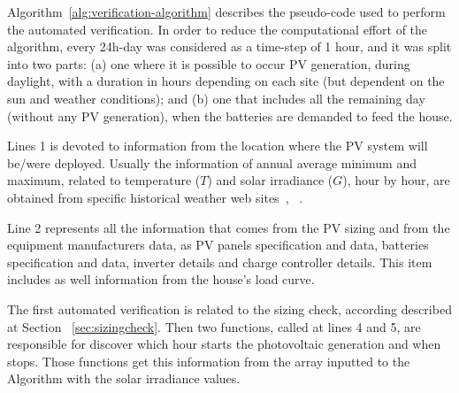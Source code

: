 \documentclass[review]{elsarticle}
\begin{document}
Algorithm~\ref{alg:verification-algorithm} describes the pseudo-code used to perform the automated verification. %
In order to reduce the computational effort of the algorithm,
every 24h-day was considered as a time-step of 1 hour, and it was split into two parts: (a) one where it is possible to occur PV generation, during daylight, with a duration in hours depending on each site (but dependent on the sun and weather conditions); and (b) one that includes all the remaining day (without any PV generation), when the batteries are demanded to feed the house.

Lines 1 is devoted to information from the location where the PV system will be/were deployed. Usually the information of annual average minimum and maximum, related to temperature ($T$) and solar irradiance ($G$), hour by hour, are obtained from specific historical weather web sites~\cite{Temperature}, ~\cite{Irradiance}.

Line 2 represents all the information that comes from the PV sizing and from the equipment manufacturers data, as PV panels specification and data, batteries specification and data, inverter details and charge controller details. This item includes as well information from the house's load curve.

The first automated verification is related to the sizing check, according described at Section ~\ref{sec:sizingcheck}. Then two functions, called at lines 4 and 5, are responsible for discover which hour starts the photovoltaic generation and when stops. Those functions get this information from the array inputted to the Algorithm with the solar irradiance values.
\end{document}
